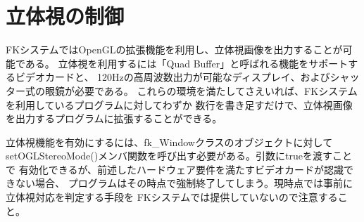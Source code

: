 \section{立体視の制御}

FKシステムではOpenGLの拡張機能を利用し、立体視画像を出力することが可能である。
立体視を利用するには「Quad Buffer」と呼ばれる機能をサポートするビデオカードと、
120Hzの高周波数出力が可能なディスプレイ、およびシャッター式の眼鏡が必要である。
これらの環境を満たしてさえいれば、FKシステムを利用しているプログラムに対してわずか
数行を書き足すだけで、立体視画像を出力するプログラムに拡張することができる。

立体視機能を有効にするには、fk\_Windowクラスのオブジェクトに対して
setOGLStereoMode()メンバ関数を呼び出す必要がある。引数にtrueを渡すことで
有効化できるが、前述したハードウェア要件を満たすビデオカードが認識できない場合、
プログラムはその時点で強制終了してしまう。現時点では事前に立体視対応を判定する手段を
FKシステムでは提供していないので注意すること。

